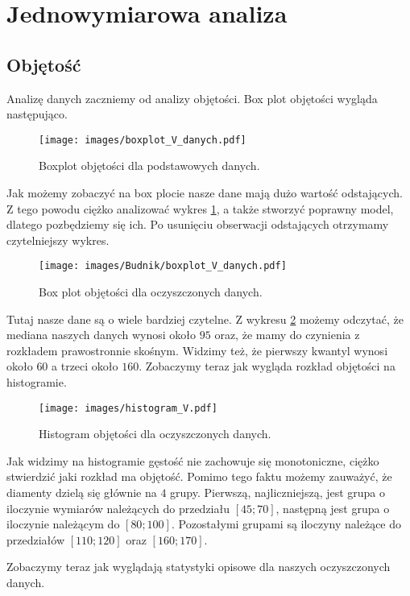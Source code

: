 \documentclass[12pt]{article}
\theoremstyle{exer}
\begin{document}
	\section{Jednowymiarowa analiza}
	\subsection{Objętość}
	Analizę danych zaczniemy od analizy objętości. Box plot objętości wygląda następująco.
	
	\begin{figure}[H]
		\centering
		\texttt{[image: images/boxplot\_V\_danych.pdf]}
		\caption{Boxplot objętości dla podstawowych danych.}
		\label{fig:box_V_orginal}
	\end{figure}
	
	Jak możemy zobaczyć na box plocie nasze dane mają dużo wartość odstających. Z tego powodu ciężko analizować wykres \ref{fig:box_V_orginal}, a także stworzyć poprawny model, dlatego pozbędziemy się ich. Po usunięciu obserwacji odstających otrzymamy czytelniejszy wykres.
	
	\begin{figure}[H]
		\centering
		\texttt{[image: images/Budnik/boxplot\_V\_danych.pdf]}
		\caption{Box plot objętości dla oczyszczonych danych.}
		\label{fig:box_V}
	\end{figure}
	Tutaj nasze dane są o wiele bardziej czytelne. Z wykresu \ref{fig:box_V} możemy odczytać, że mediana naszych danych wynosi około $95$ oraz, że mamy do czynienia z rozkładem prawostronnie skośnym. Widzimy też, że pierwszy kwantyl wynosi około $60$ a trzeci około $160$.
	Zobaczymy teraz jak wygląda rozkład objętości na histogramie.
	\begin{figure}[H]
		\centering
		\texttt{[image: images/histogram\_V.pdf]}
		\caption{Histogram objętości dla oczyszczonych danych.}
		\label{fig:hist_V}
	\end{figure}
	Jak widzimy na histogramie gęstość nie zachowuje się monotoniczne, ciężko stwierdzić jaki rozkład ma objętość. Pomimo tego faktu możemy zauważyć, że diamenty dzielą się głównie na $4$ grupy. Pierwszą, najliczniejszą, jest grupa o iloczynie wymiarów należących do przedziału $[45;70] $, następną jest grupa o iloczynie należącym do $[80;100]$. Pozostałymi grupami są iloczyny należące do przedziałów $[110;120]$ oraz $[160;170]$.
	
	Zobaczymy teraz jak wyglądają statystyki opisowe dla naszych oczyszczonych danych.
	
\end{document}

